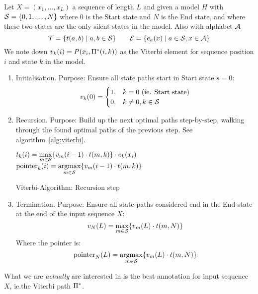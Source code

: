 \begin{definition}
Let \(X=(x_1,\dotsc,x_L)\) a sequence of length \(L\) and given a model \(H\)
with \(\mathcal{S}=\{0,1,\dotsc,N\}\) where \(0\) is the Start state and \(N\) is
the End state, and where these two states are the only silent states in the
model.  Also with alphabet \(\mathcal{A}\)
\[
    \mathcal{T} = \{ t(a,b) \mid a,b \in \mathcal{S} \} \qquad
    \mathcal{E} = \{ e_a(x) \mid a \in \mathcal{S}, x\in\mathcal{A} \}
\]
We note down \(v_k(i) = P(x_i,\Pi^*(i,k))\) as the Viterbi element for
sequence position \(i\) and state \(k\) in the model.

\begin{enumerate}[label=(\alph*)]
\item Initialisation. Purpose: Ensure all state paths start in Start state
  \(s=0\):
  \[
      v_k(0) = \begin{cases}
          1, & k = 0 \text{ (ie. Start state)} \\
          0, & k \neq 0, k\in\mathcal{S}
      \end{cases}
  \]
\item Recursion.  Purpose: Build up the next optimal paths step-by-step, walking
through the found optimal paths of the previous step.
See algorithm~\ref{alg:viterbi}.

\SetStartEndCondition{ (}{)}{)}
\SetAlgoBlockMarkers{}{\}}
\AlgoDisplayBlockMarkers\SetAlgoNoLine%
\begin{algorithm}[ht]
 {
     {
        $t_k(i) = \max\limits_{m\in\mathcal{S}} \{ v_m(i-1) \cdot t(m,k) \} \cdot e_k(x_i)$\;
        $\text{pointer}_k(i) = \operatorname*{argmax}\limits_{m\in\mathcal{S}} \{ v_m(i-1) \cdot t(m,k) \}$\;
    }
}
\label{alg:viterbi}
\caption{Viterbi-Algorithm: Recursion step}
\end{algorithm}
\item Termination. Purpose: Ensure all state paths considered end in the End
  state at the end of the input sequence \(X\):
  \[
      v_N(L) = \max_{m\in\mathcal{S}} \{ v_m(L) \cdot t(m,N) \}
  \]
  Where the pointer is:
  \[
      \text{pointer}_N(L) = \operatorname*{argmax}_{m\in\mathcal{S}} \{ v_m(L) \cdot t(m,N) \}
  \]
\end{enumerate}
What we are \emph{actually} are interested in is the best annotation for input
sequence \(X\), ie.\@ the Viterbi path \(\Pi^*\).


\end{definition}
